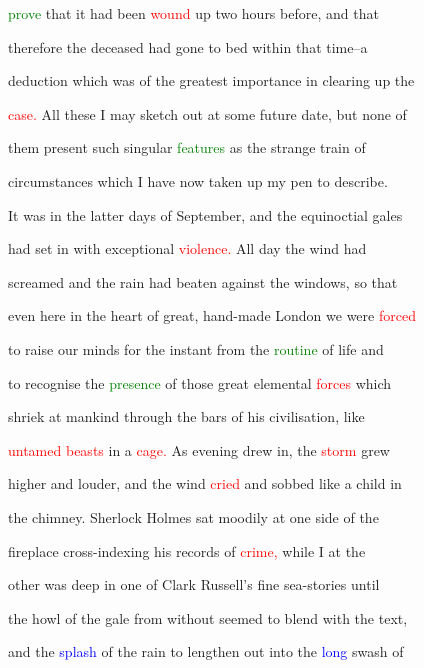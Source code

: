  \textcolor{green}{prove} that it had been \textcolor{red}{wound} up two hours before, and that

 therefore the deceased had gone to bed within that time--a

 deduction which was of the greatest \textcolor{BurntOrange}{importance} in clearing up the

 \textcolor{red}{case.} All these I may sketch out at some future date, but none of

 them \textcolor{BurntOrange}{present} such singular \textcolor{green}{features} as the strange train of

 circumstances which I have now taken up my pen to describe.



 It was in the latter days of September, and the equinoctial gales

 had set in with exceptional \textcolor{red}{violence.} All day the wind had

 \textcolor{BurntOrange}{screamed} and the rain had beaten against the windows, so that

 even here in the heart of great, hand-made London we were \textcolor{red}{forced}

 to raise our minds for the instant from the \textcolor{green}{routine} of life and

 to recognise the \textcolor{green}{presence} of those great elemental \textcolor{red}{forces} which

 \textcolor{BurntOrange}{shriek} at mankind through the bars of his civilisation, like

 \textcolor{red}{untamed} \textcolor{red}{beasts} in a \textcolor{red}{cage.} As evening drew in, the \textcolor{red}{storm} \textcolor{BurntOrange}{grew}

 higher and louder, and the wind \textcolor{red}{cried} and sobbed like a \textcolor{BurntOrange}{child} in

 the chimney. Sherlock Holmes sat moodily at one side of the

 fireplace cross-indexing his records of \textcolor{red}{crime,} while I at the

 other was deep in one of Clark Russell's fine sea-stories until

 the \textcolor{BurntOrange}{howl} of the gale from without seemed to blend with the text,

 and the \textcolor{blue}{splash} of the rain to lengthen out into the \textcolor{blue}{long} swash of

